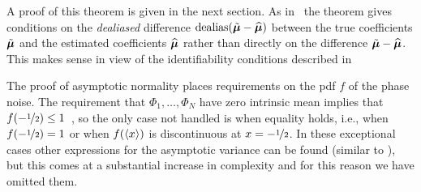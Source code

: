 \documentclass[journal]{IEEEtran}
\begin{document}
A proof of this theorem is given in the next section.  %
As in~\cite{McKilliam_pps1_2012} the theorem gives conditions on the \emph{dealiased} difference $\operatorname{dealias}(\tilde{\boldsymbol{\mu}} - \widehat{\boldsymbol{\mu}})$ between the true coefficients $\tilde{\boldsymbol{\mu}}$ and the estimated coefficients $\widehat{\boldsymbol{\mu}}$ rather than directly on the difference $\tilde{\boldsymbol{\mu}} - \widehat{\boldsymbol{\mu}}$.  This makes sense in view of the identifiability conditions described in~\cite[Sec.~3]{McKilliam_pps1_2012}  %


The proof of asymptotic normality places requirements on the pdf $f$ of the phase noise.  The requirement that $\Phi_1, \dots, \Phi_N$ have zero intrinsic mean implies that $f(-\nicefrac{1}{2}) \leq 1$~\cite[Lemma~1]{McKilliam_mean_dir_est_sq_arc_length2010}, so the only case not handled is when equality holds, i.e., when $f(-\nicefrac{1}{2}) = 1$ or when $f(\left\langle x \right\rangle)$ is discontinuous at $x = -\nicefrac{1}{2}$. In these exceptional cases other expressions for the asymptotic variance can be found (similar to \cite[Theorem 3.1]{Hotz_circle_means_2011}), but this comes at a substantial increase in complexity and for this reason we have omitted them. %
\end{document}

